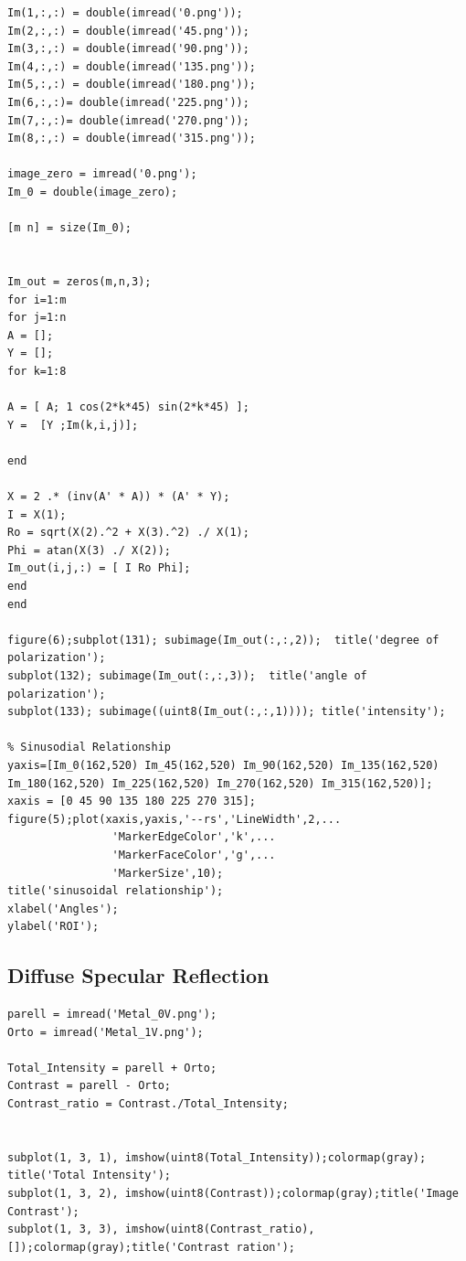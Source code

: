 \documentclass{article}
\begin{document}
		\begin{lstlisting}[label=exercices-h-traversal,caption=Least Mean Square Method]	
Im(1,:,:) = double(imread('0.png'));
Im(2,:,:) = double(imread('45.png'));
Im(3,:,:) = double(imread('90.png'));
Im(4,:,:) = double(imread('135.png'));
Im(5,:,:) = double(imread('180.png'));
Im(6,:,:)= double(imread('225.png'));
Im(7,:,:)= double(imread('270.png'));
Im(8,:,:) = double(imread('315.png'));

image_zero = imread('0.png');
Im_0 = double(image_zero);

[m n] = size(Im_0);


Im_out = zeros(m,n,3);
for i=1:m
for j=1:n
A = [];
Y = [];
for k=1:8 
    
A = [ A; 1 cos(2*k*45) sin(2*k*45) ];
Y =  [Y ;Im(k,i,j)];

end

X = 2 .* (inv(A' * A)) * (A' * Y);
I = X(1);
Ro = sqrt(X(2).^2 + X(3).^2) ./ X(1);
Phi = atan(X(3) ./ X(2));
Im_out(i,j,:) = [ I Ro Phi];
end
end

figure(6);subplot(131); subimage(Im_out(:,:,2));  title('degree of polarization');
subplot(132); subimage(Im_out(:,:,3));  title('angle of polarization');
subplot(133); subimage((uint8(Im_out(:,:,1)))); title('intensity');

% Sinusodial Relationship
yaxis=[Im_0(162,520) Im_45(162,520) Im_90(162,520) Im_135(162,520) Im_180(162,520) Im_225(162,520) Im_270(162,520) Im_315(162,520)];
xaxis = [0 45 90 135 180 225 270 315];
figure(5);plot(xaxis,yaxis,'--rs','LineWidth',2,...
                'MarkerEdgeColor','k',...
                'MarkerFaceColor','g',...
                'MarkerSize',10);
title('sinusoidal relationship');
xlabel('Angles');
ylabel('ROI');
		\end{lstlisting}
	



	
	
	
	
	
	
	\subsection{Diffuse Specular Reflection}
	
		\begin{lstlisting}[label=exercices-h-traversal,caption=Specular Reflection Removal]
% Diffuse Specular reflection
parell = imread('Metal_0V.png');
Orto = imread('Metal_1V.png');

Total_Intensity = parell + Orto;
Contrast = parell - Orto;
Contrast_ratio = Contrast./Total_Intensity;


subplot(1, 3, 1), imshow(uint8(Total_Intensity));colormap(gray); title('Total Intensity');
subplot(1, 3, 2), imshow(uint8(Contrast));colormap(gray);title('Image Contrast');
subplot(1, 3, 3), imshow(uint8(Contrast_ratio), []);colormap(gray);title('Contrast ration');
		\end{lstlisting}
	
	
	
	
	
	
	
	
	

	
	
	
	
	
	
	
\end{document}
